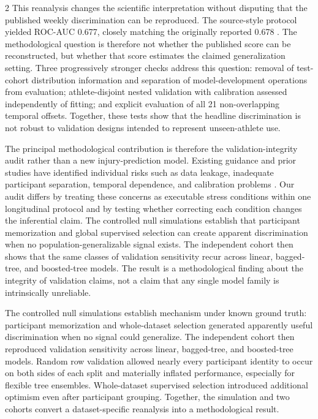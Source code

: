 \documentclass[11pt,a4paper]{article}
\begin{document}
\begin{multicols}{2}
This reanalysis changes the scientific interpretation without disputing that the published weekly discrimination can be reproduced. The source-style protocol yielded ROC-AUC 0.677, closely matching the originally reported 0.678 \cite{lovdal2021}. The methodological question is therefore not whether the published score can be reconstructed, but whether that score estimates the claimed generalization setting. Three progressively stronger checks address this question: removal of test-cohort distribution information and separation of model-development operations from evaluation; athlete-disjoint nested validation with calibration assessed independently of fitting; and explicit evaluation of all 21 non-overlapping temporal offsets. Together, these tests show that the headline discrimination is not robust to validation designs intended to represent unseen-athlete use.

The principal methodological contribution is therefore the validation-integrity audit rather than a new injury-prediction model. Existing guidance and prior studies have identified individual risks such as data leakage, inadequate participant separation, temporal dependence, and calibration problems \cite{vaneetvelde2021,kapoor2023,collins2024,moons2025}. Our audit differs by treating these concerns as executable stress conditions within one longitudinal protocol and by testing whether correcting each condition changes the inferential claim. The controlled null simulations establish that participant memorization and global supervised selection can create apparent discrimination when no population-generalizable signal exists. The independent cohort then shows that the same classes of validation sensitivity recur across linear, bagged-tree, and boosted-tree models. The result is a methodological finding about the integrity of validation claims, not a claim that any single model family is intrinsically unreliable.

The controlled null simulations establish mechanism under known ground truth: participant memorization and whole-dataset selection generated apparently useful discrimination when no signal could generalize. The independent cohort then reproduced validation sensitivity across linear, bagged-tree, and boosted-tree models. Random row validation allowed nearly every participant identity to occur on both sides of each split and materially inflated performance, especially for flexible tree ensembles. Whole-dataset supervised selection introduced additional optimism even after participant grouping. Together, the simulation and two cohorts convert a dataset-specific reanalysis into a methodological result.


\end{multicols}
\end{document}
